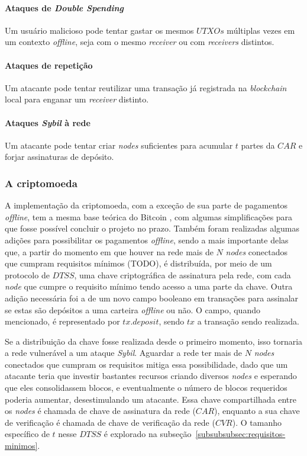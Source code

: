 \documentclass[
  12pt,
  a4paper,
  oneside,
  article,
]{abntex2}
\begin{document}
\paragraph{Ataques de \textit{Double Spending}}
Um usuário malicioso pode tentar gastar os mesmos $UTXOs$ múltiplas vezes em um contexto \textit{offline}, seja com o mesmo \textit{receiver} ou com \textit{receivers} distintos.

\paragraph{Ataques de repetição}
Um atacante pode tentar reutilizar uma transação já registrada na \textit{blockchain} local para enganar um \textit{receiver} distinto.

\paragraph{Ataques \textit{Sybil} à rede}
Um atacante pode tentar criar \textit{nodes} suficientes para acumular $t$ partes da $CAR$ e forjar assinaturas de depósito.

\subsubsection{A criptomoeda}

A implementação da criptomoeda, com a exceção de sua parte de pagamentos \textit{offline}, tem a mesma base teórica do Bitcoin \cite{nakamoto2008} \cite{bitcoinorg}, com algumas simplificações para que fosse possível concluir o projeto no prazo. Também foram realizadas algumas adições para possibilitar os pagamentos \textit{offline}, sendo a mais importante delas que, a partir do momento em que houver na rede mais de $N$ \textit{nodes} conectados que cumpram requisitos mínimos (TODO), é distribuída, por meio de um protocolo de $DTSS$, uma chave criptográfica de assinatura pela rede, com cada \textit{node} que cumpre o requisito mínimo tendo acesso a uma parte da chave. Outra adição necessária foi a de um novo campo booleano em transações para assinalar se estas são depósitos a uma carteira \textit{offline} ou não. O campo, quando mencionado, é representado por $tx.deposit$, sendo $tx$ a transação sendo realizada.

Se a distribuição da chave fosse realizada desde o primeiro momento, isso tornaria a rede vulnerável a um ataque \textit{Sybil}. Aguardar a rede ter mais de $N$ \textit{nodes} conectados que cumpram os requisitos mitiga essa possibilidade, dado que um atacante teria que investir bastantes recursos criando diversos \textit{nodes} e esperando que eles consolidassem blocos, e eventualmente o número de blocos requeridos poderia aumentar, desestimulando um atacante. Essa chave compartilhada entre os \textit{nodes} é chamada de chave de assinatura da rede ($CAR$), enquanto a sua chave de verificação é chamada de chave de verificação da rede ($CVR$). O tamanho específico de $t$ nesse $DTSS$ é explorado na subseção~\ref{subsubsubsec:requisitos-minimos}.
\end{document}
